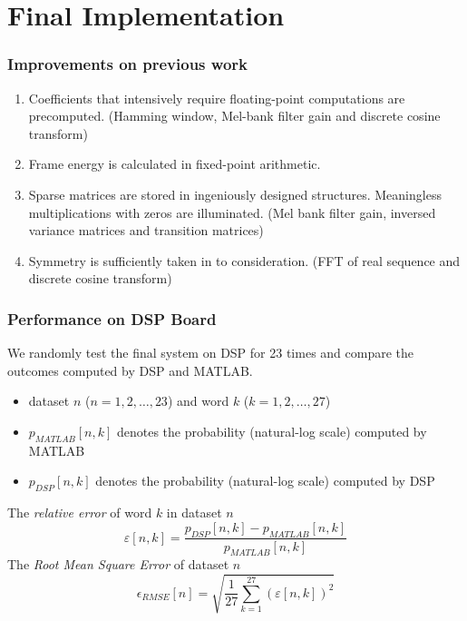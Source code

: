 \section{Final Implementation}

\begin{frame}
\frametitle{Improvements on previous work}
\begin{enumerate}
\item Coefficients that intensively require floating-point computations are precomputed. (Hamming window, Mel-bank filter gain and discrete cosine transform)
\item Frame energy is calculated in fixed-point arithmetic.
\item Sparse matrices are stored in ingeniously designed structures. Meaningless multiplications with zeros are illuminated. (Mel bank filter gain, inversed variance matrices and transition matrices)
\item Symmetry is sufficiently taken in to consideration. (FFT of real sequence and discrete cosine transform)
\end{enumerate}
\end{frame}

\begin{frame}
\frametitle{Performance on DSP Board}
We randomly test the final system on DSP for 23 times and compare the outcomes computed by DSP and MATLAB.
\begin{itemize}
	\item dataset $n$ ($n = 1, 2, \dots, 23$) and word $k$ ($k = 1, 2, \dots, 27$)
	\item $p_{MATLAB}[n, k]$ denotes the probability (natural-log scale) computed by MATLAB
	\item $p_{DSP}[n, k]$ denotes the probability (natural-log scale) computed by DSP
\end{itemize}

The \textit{relative error} of word $k$ in dataset $n$
\begin{equation}
\varepsilon[n, k] = \frac{p_{DSP}[n, k] - p_{MATLAB}[n, k]}{p_{MATLAB}[n, k]}
\end{equation}
The \textit{Root Mean Square Error} of dataset $n$
\begin{equation}
\epsilon_{RMSE}[n] = \sqrt{\frac{1}{27} \sum_{k = 1}^{27} (\varepsilon[n, k])^2}
\end{equation}
\end{frame}
